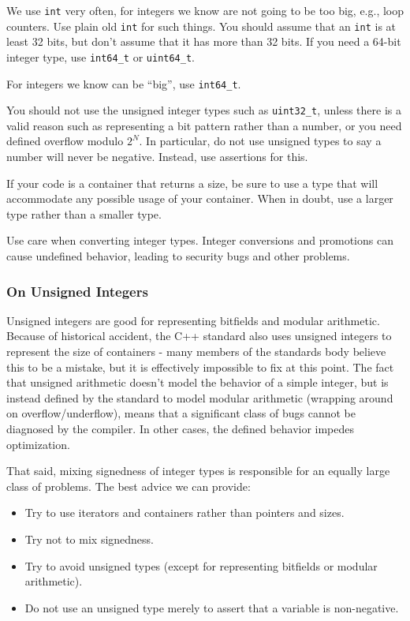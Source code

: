 We use \texttt{int} very often, for integers we know are not going to be too big, e.g., loop counters. Use plain old \texttt{int} for such things. You should assume that an \texttt{int} is at least 32 bits, but don't assume that it has more than 32 bits. If you need a 64-bit integer type, use \texttt{int64_t} or \texttt{uint64_t}.

For integers we know can be \enquote{big}, use \texttt{int64_t}.

You should not use the unsigned integer types such as \texttt{uint32_t}, unless there is a valid reason such as representing a bit pattern rather than a number, or you need defined overflow modulo $2^N$. In particular, do not use unsigned types to say a number will never be negative. Instead, use assertions for this.

If your code is a container that returns a size, be sure to use a type that will accommodate any possible usage of your container. When in doubt, use a larger type rather than a smaller type.

Use care when converting integer types. Integer conversions and promotions can cause undefined behavior, leading to security bugs and other problems.

\subsubsection{On Unsigned Integers}
Unsigned integers are good for representing bitfields and modular arithmetic. Because of historical accident, the C++ standard also uses unsigned integers to represent the size of containers - many members of the standards body believe this to be a mistake, but it is effectively impossible to fix at this point. The fact that unsigned arithmetic doesn't model the behavior of a simple integer, but is instead defined by the standard to model modular arithmetic (wrapping around on overflow/underflow), means that a significant class of bugs cannot be diagnosed by the compiler. In other cases, the defined behavior impedes optimization.

That said, mixing signedness of integer types is responsible for an equally large class of problems. The best advice we can provide:
\begin{itemize}
    \item Try to use iterators and containers rather than pointers and sizes.
    \item Try not to mix signedness.
    \item Try to avoid unsigned types (except for representing bitfields or modular arithmetic).
    \item Do not use an unsigned type merely to assert that a variable is non-negative.
\end{itemize}
